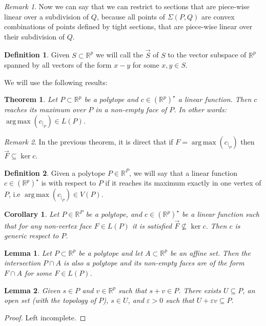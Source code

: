 \documentclass[10pt,a4paper]{article}
\let\emph\relax %
\DeclareMathOperator*{\argmax}{arg\,max}
\newcommand{\RR}{\mathbb{R}}
\newcommand{\eps}{\varepsilon}
\theoremstyle{plain}
\newtheorem{theorem}{Theorem}
\newtheorem{lemma}{Lemma}
\newtheorem{corollary}{Corollary}
\theoremstyle{remark}
\newtheorem{remark}{Remark}
\theoremstyle{definition}
\newtheorem{definition}{Definition}
\begin{document}
\begin{remark}
	Now we can say that we can restrict to sections
	that are  piece-wise linear over a subdivision of $Q$,
	because all points of $\Sigma(P,Q)$ are convex combinations
	of points defined by tight sections, 
	that are piece-wise linear over their subdivision of $Q$.
\end{remark}

\begin{definition} 
	Given $S\subset \RR^p$ we will call the \emph{direction}
	$\overrightarrow{S}$ of $S$ to the vector subspace of $\RR^p$ 
	spanned by all vectors of the form $x-y$ for some $x,y\in S$. 
\end{definition}

We will use the following results:

\begin{theorem} 
	\label{thm:maxLinearInPolytope}
	Let $P \subset \RR^p$ be a polytope and $c\in (\RR^ p)^\star$ a linear function. 
	Then $c$ reaches its maximum over $P$ in a non-empty face of $P$. 
	In other words: $\argmax(c_{|_P})\in L(P)$.
\end{theorem}

\begin{remark} In the previous theorem, it is direct that if $F=\argmax(c_{|_P})$ 
	then $\overrightarrow{F}\subseteq \ker c$.
\end{remark}

\begin{definition}
	Given a polytope $P\in \RR^P$, we will say that a linear function $c\in (\RR^p)^\star$ 
	is  \emph{generic} with respect to $P$ if it reaches its maximum exactly in one vertex of $P$, i.e $\argmax(c_{|_P})\in V(P)$.
\end{definition}


\begin{corollary} Let $P\in \RR^P$ be a polytope, and $c\in (\RR^p)^\star$ be a linear function such that for any non-vertex face $F\in L(P)$ it is satisfied $\overrightarrow{F}\nsubseteq \ker c$. Then $c$ is generic respect to $P$.
\end{corollary}

\begin{lemma} 
	Let $P \subset \RR^p$ be a polytope and let $A \subset \RR^p$ be an affine set.
	Then the intersection $P \cap A$ is also a polytope 
	and its non-empty faces are of the form $F\cap A$ for some $F\in L(P)$.
\end{lemma}

\begin{lemma}
	\label{lem:lemilla}
	Given $s\in  {P}$ and $v\in\RR^p$ such that $s+v\in   P$.
	There exists $U\subseteq   P$, 
	an open set (with the topology of $  P$), $s\in U$,
	and $\eps > 0$ such that $U+\eps v \subseteq   P$.
\end{lemma}
\begin{proof}
	Left incomplete.
\end{proof}
\end{document}
